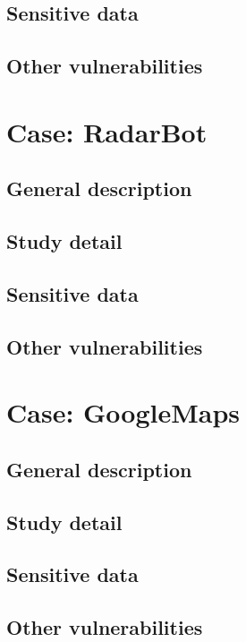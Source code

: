 		\subsection{Sensitive data}
		\subsection{Other vulnerabilities}

	\section{Case: RadarBot}
		\subsection{General description}
		\subsection{Study detail}
		\subsection{Sensitive data}
		\subsection{Other vulnerabilities}

	\section{Case: GoogleMaps}
	\label{sec:google_maps}
		\subsection{General description}
		\subsection{Study detail}
		\subsection{Sensitive data}
		\subsection{Other vulnerabilities}